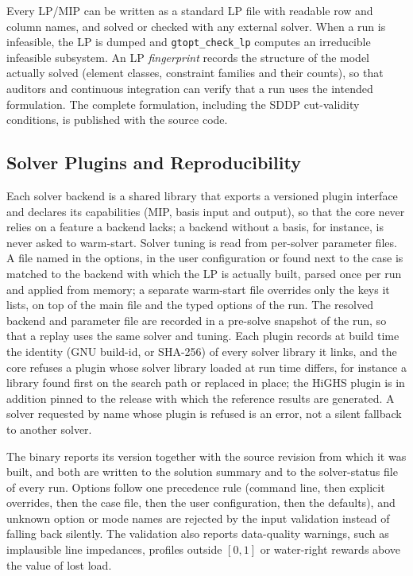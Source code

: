 Every LP/MIP can be written as a standard LP file with readable row and
column names, and solved or checked with any external solver.  When a
run is infeasible, the LP is dumped and \texttt{gtopt\_check\_lp}
computes an irreducible infeasible subsystem.  An LP
\emph{fingerprint} records the structure of the model actually solved
(element classes, constraint families and their counts), so that
auditors and continuous integration can verify that a run uses the
intended formulation.  The complete formulation, including the SDDP
cut-validity conditions, is published with the source code.

\subsection{Solver Plugins and Reproducibility}
\label{sec:plugins}

Each solver backend is a shared library that exports a versioned plugin
interface and declares its capabilities (MIP, basis input and output),
so that the core never relies on a feature a backend lacks; a backend
without a basis, for instance, is never asked to warm-start.  Solver
tuning is read from per-solver parameter files.  A file named in the
options, in the user configuration or found next to the case is matched
to the backend with which the LP is actually built, parsed once per run
and applied from memory; a separate warm-start file overrides only the
keys it lists, on top of the main file and the typed options of the
run.  The resolved backend and parameter file are recorded in a
pre-solve snapshot of the run, so that a replay uses the same solver
and tuning.  Each plugin records at build time the identity (GNU
build-id, or SHA-256) of every solver library it links, and the core
refuses a plugin whose solver library loaded at run time differs, for
instance a library found first on the search path or replaced in
place; the HiGHS plugin is in addition pinned to the release with which
the reference results are generated.  A solver requested by name whose
plugin is refused is an error, not a silent fallback to another
solver.

The binary reports its version together with the source revision from
which it was built, and both are written to the solution summary and
to the solver-status file of every run.  Options follow one precedence
rule (command line, then explicit overrides, then the case file, then
the user configuration, then the defaults), and unknown option or mode
names are rejected by the input validation instead of falling back
silently.  The validation also reports data-quality warnings, such as
implausible line impedances, profiles outside $[0,1]$ or water-right
rewards above the value of lost load.

